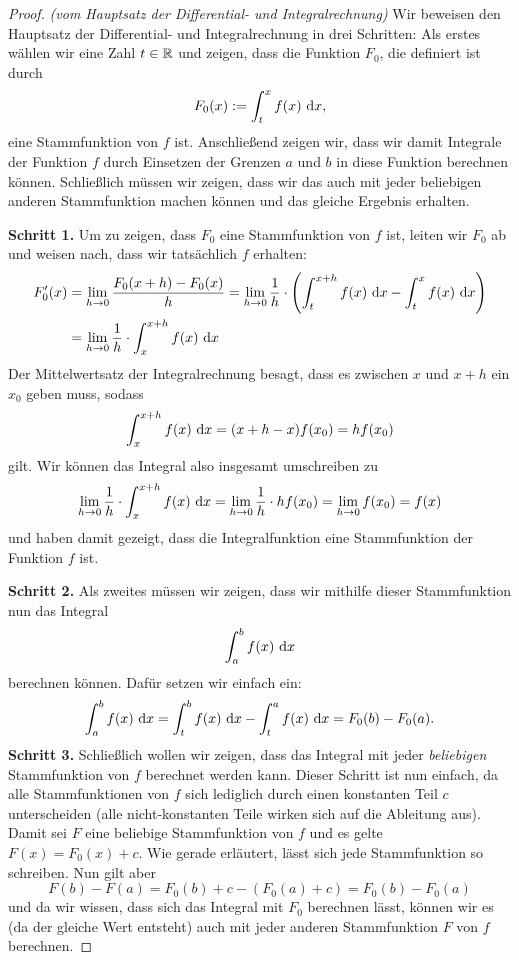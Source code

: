 \documentclass[../../main.tex]{subfiles}
\begin{document}
\begin{proof}
    \emph{(vom Hauptsatz der Differential- und Integralrechnung)}
    Wir beweisen den Hauptsatz der Differential- und Integralrechnung in drei Schritten: Als erstes wählen wir eine
    Zahl $t\in\mathbb{R}$ und zeigen, dass 
    die Funktion $F_0$, die definiert ist durch
    \[F_0(x):=\int_t^x f(x)\mathop{}\mathrm{d} x,\]
    eine Stammfunktion von $f$ ist. Anschließend zeigen wir, dass wir damit Integrale der Funktion $f$ durch 
    Einsetzen der Grenzen $a$ und $b$ in diese Funktion berechnen können. Schließlich müssen wir zeigen, dass wir das 
    auch mit jeder beliebigen anderen Stammfunktion machen können und das gleiche Ergebnis erhalten.
    
    \textbf{Schritt 1.} Um zu zeigen, dass $F_0$ eine Stammfunktion von $f$ ist, leiten wir $F_0$ ab und weisen nach, dass wir 
    tatsächlich $f$ erhalten:
    \begin{align*}
        F_0'(x)&=\lim_{h\rightarrow 0} \frac{F_0(x+h)-F_0(x)}{h}=\lim_{h\rightarrow 0}\frac{1}{h}\cdot\Biggl(\int_t^{x+h} f(x)\mathop{}\mathrm{d} x-\int_t^x f(x)\mathop{}\mathrm{d} x\Biggr)\\
        &=\lim_{h\rightarrow 0}\frac{1}{h}\cdot\int_x^{x+h} f(x)\mathop{}\mathrm{d} x
    \end{align*}
    Der Mittelwertsatz der Integralrechnung besagt, dass es zwischen $x$ und $x+h$ ein $x_0$ geben muss, sodass 
    \[\int_x^{x+h} f(x)\mathop{}\mathrm{d} x=(x+h-x)f(x_0)=hf(x_0)\]
    gilt. Wir können das Integral also insgesamt umschreiben zu
    \[\lim_{h\rightarrow 0}\frac{1}{h}\cdot\int_x^{x+h} f(x)\mathop{}\mathrm{d} x=\lim_{h\rightarrow 0}\frac{1}{h}\cdot hf(x_0)=\lim_{h\rightarrow 0} f(x_0)=f(x)\]
    und haben damit gezeigt, dass die Integralfunktion eine Stammfunktion der Funktion $f$ ist.
    
    \textbf{Schritt 2.} Als zweites müssen wir zeigen, dass wir mithilfe dieser Stammfunktion nun das Integral \[\int_a^b f(x)\mathop{}\mathrm{d} x\] 
    berechnen können. Dafür setzen wir einfach ein:
    \[\int_a^b f(x)\mathop{}\mathrm{d} x=\int_t^b f(x)\mathop{}\mathrm{d} x-\int_t^a f(x)\mathop{}\mathrm{d} x=F_0(b)-F_0(a).\]
    \textbf{Schritt 3.} Schließlich wollen wir zeigen, dass das Integral mit jeder \textit{beliebigen} Stammfunktion von $f$ berechnet 
    werden kann. Dieser Schritt ist nun einfach, da alle Stammfunktionen von $f$ sich lediglich durch einen konstanten 
    Teil $c$ unterscheiden (alle nicht-konstanten Teile wirken sich auf die Ableitung aus). Damit sei $F$ eine beliebige 
    Stammfunktion von $f$ und es gelte $F(x)=F_0(x)+c$. Wie gerade erläutert, lässt sich jede Stammfunktion so schreiben. 
    Nun gilt aber
    \[F(b)-F(a)=F_0(b)+c-(F_0(a)+c)=F_0(b)-F_0(a)\]
    und da wir wissen, dass sich das Integral mit $F_0$ berechnen lässt, können wir es (da der gleiche Wert entsteht) 
    auch mit jeder anderen Stammfunktion $F$ von $f$ berechnen.
    \end{proof}
    
\end{document}
